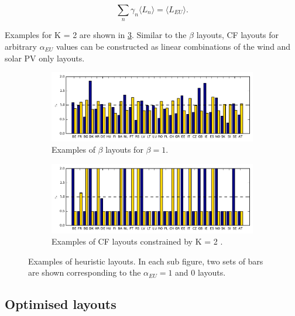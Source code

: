 \documentclass[a4paper, 5p, sort&compress]{elsarticle}%
\newcommand{\mean}[1]{\langle #1 \rangle}
\newcommand{\chromowidth}{1.00 \columnwidth}
\begin{document}
\begin{equation}
  \label{eq:norm}
  \sum_{n} \gamma_{n} \mean{L_{n}} = \mean{L_{EU}}.
\end{equation}

Examples for K = 2 are shown in
\cref{fig:examples}. Similar to the $\beta$ layouts, CF layouts for
arbitrary $\alpha_{EU}$ values can be constructed as linear combinations of the
wind and solar PV only layouts.

\begin{figure}[t!]
  \centering
  \begin{subfigure}{2\columnwidth}
    \includegraphics[width = \chromowidth, center]{beta=1}
    \caption{Examples of $\beta$ layouts for $\beta = 1$.}
    \label{fig:betaExamples}
  \end{subfigure}
  \begin{subfigure}{2\columnwidth}
    \includegraphics[width = \chromowidth, center]{k=2cfMax}
    \caption{Examples of CF layouts constrained by K = 2 .}
    \label{fig:cfMaxExamples}
  \end{subfigure}
  \caption{Examples of heuristic layouts. In each sub figure, two sets
    of bars are shown corresponding to the $\alpha_{EU} = 1$ and $0$
    layouts.}
  \label{fig:examples}
\end{figure}

\subsection{Optimised layouts}
\label{sec:optimized-layouts}
\end{document}
